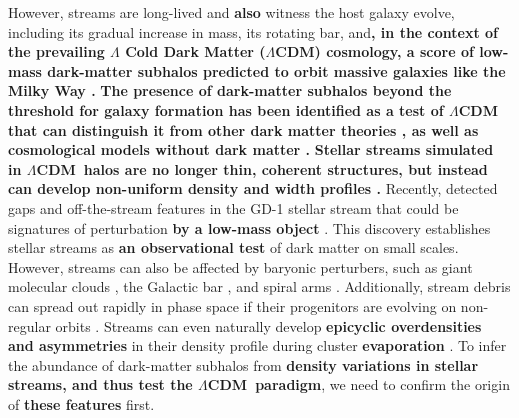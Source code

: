 \documentclass[twocolumn]{aastex62}
\newcommand{\lcdm}{$\Lambda$CDM}
\newcommand{\changes}[1]{{\textbf{#1}}}
\begin{document}
However, streams are long-lived and \changes{also} witness the host galaxy evolve, including its gradual increase in mass, its rotating bar, and\changes{, in the context of the prevailing $\Lambda$ Cold Dark Matter (\lcdm) cosmology, a score of low-mass dark-matter subhalos predicted to orbit massive galaxies like the Milky Way \citep[e.g.,][]{Diemand:2008, Springel:2008}.}
\changes{The presence of dark-matter subhalos beyond the threshold for galaxy formation has been identified as a test of \lcdm\ \citep{Bullock:2017} that can distinguish it from other dark matter theories \citep[e.g.,][]{Hu:2000, Bode:2001}, as well as cosmological models without dark matter \citep[e.g.,][]{Milgrom:1983, Kroupa:2015}.}
\changes{Stellar streams simulated in \lcdm\ halos are no longer thin, coherent structures, but instead can develop non-uniform density and width profiles \citep[e.g.,][]{Bonaca:2014, Ngan:2015}.}
Recently, \citet{Price-Whelan:2018} detected gaps and off-the-stream features in the GD-1 stellar stream that could be signatures of perturbation \changes{by a low-mass object} \citep{Bonaca:2018b}.
This discovery establishes stellar streams as \changes{an observational test} of dark matter on small scales.
However, streams can also be affected by baryonic perturbers, such as giant molecular clouds \citep{Amorisco:2016}, the Galactic bar \citep{Pearson:2017}, and spiral arms \citep{Banik:2019}.
Additionally, stream debris can spread out rapidly in phase space if their progenitors are evolving on non-regular orbits \citep[e.g.,][]{Pearson:2015, Fardal:2015, Price-Whelan:2016, Price-Whelan:2016b}.
Streams can even naturally develop \changes{epicyclic overdensities and asymmetries} in their density profile during cluster \changes{evaporation} \citep[e.g.,][]{Kupper:2008, Just:2009, Kupper:2010}.
To infer the abundance of dark-matter subhalos from \changes{density variations in stellar streams, and thus test the \lcdm\ paradigm}, we need to confirm the origin of \changes{these features} first.
\end{document}

